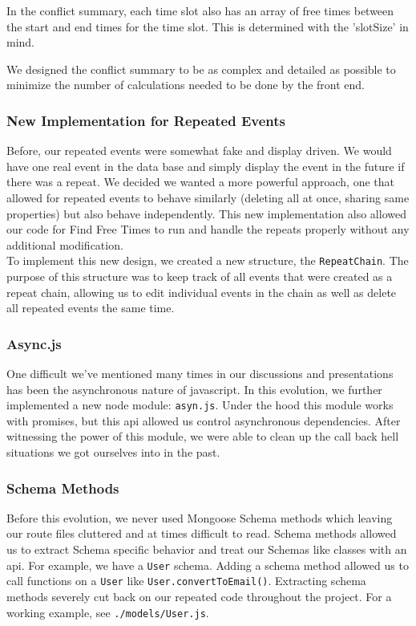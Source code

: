 \documentclass[11pt]{article}   %
\begin{document}
In the conflict summary, each time slot also has an array of free times between the start and end times for the time slot. This is determined with the 'slotSize' in mind.

We designed the conflict summary to be as complex and detailed as possible to minimize the number of calculations needed to be done by the front end.

\subsubsection{New Implementation for Repeated Events}
Before, our repeated events were somewhat fake and display driven. We would have one real event in the data base and simply display the event in the future if there was a repeat. We decided we wanted a more powerful approach, one that allowed for repeated events to behave similarly (deleting all at once, sharing same properties) but also behave independently. This new implementation also allowed our code for Find Free Times to run and handle the repeats properly without any additional modification.\\

\noindent To implement this new design, we created a new structure, the \texttt{RepeatChain}. The purpose of this structure was to keep track of all events that were created as a repeat chain, allowing us to edit individual events in the chain as well as delete all repeated events the same time.

\subsubsection{Async.js}
One difficult we've mentioned many times in our discussions and presentations has been the asynchronous nature of javascript. In this evolution, we further implemented a new node module: \texttt{asyn.js}. Under the hood this module works with promises, but this api allowed us control asynchronous dependencies. After witnessing the power of this module, we were able to clean up the call back hell situations we got ourselves into in the past.

\subsubsection{Schema Methods}
Before this evolution, we never used Mongoose Schema methods which leaving our route files cluttered and at times difficult to read. Schema methods allowed us to extract Schema specific behavior and treat our Schemas like classes with an api. For example, we have a \texttt{User} schema. Adding a schema method allowed us to call functions on a \texttt{User} like \texttt{User.convertToEmail()}. Extracting schema methods severely cut back on our repeated code throughout the project. For a working example, see \texttt{./models/User.js}.
\end{document}

